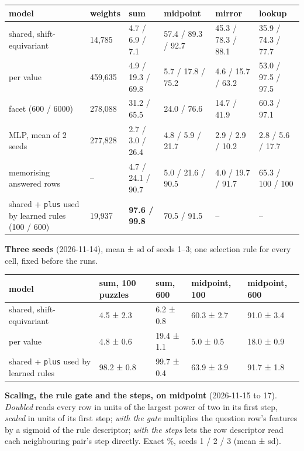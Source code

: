 \begin{center}\small
\begin{tabularx}{\linewidth}{@{}Ylllll@{}}
\toprule
model & weights & sum & midpoint & mirror & lookup \\
\midrule
shared, shift-equivariant & 14,785 & 4.7 / 6.9 / 7.1 & 57.4 / 89.3 / 92.7 & 45.3 / 78.3 / 88.1 & 35.9 / 74.3 / 77.7 \\
per value & 459,635 & 4.9 / 19.3 / 69.8 & 5.7 / 17.8 / 75.2 & 4.6 / 15.7 / 63.2 & 53.0 / 97.5 / 97.5 \\
facet (600 / 6000) & 278,088 & 31.2 / 65.5 & 24.0 / 76.6 & 14.7 / 41.9 & 60.3 / 97.1 \\
MLP, mean of 2 seeds & 277,828 & 2.7 / 3.0 / 26.4 & 4.8 / 5.9 / 21.7 & 2.9 / 2.9 / 10.2 & 2.8 / 5.6 / 17.7 \\
memorising answered rows & – & 4.7 / 24.1 / 90.7 & 5.0 / 21.6 / 90.5 & 4.0 / 19.7 / 91.7 & 65.3 / 100 / 100 \\
shared + \texttt{plus} used by learned rules (100 / 600) & 19,937 & \textbf{97.6 / 99.8} & 70.5 / 91.5 & – & – \\
\bottomrule
\end{tabularx}
\end{center}

\textbf{Three seeds} (2026-11-14), mean ± sd of seeds 1–3; one selection rule for every cell, fixed before the runs.

\begin{center}\small
\begin{tabularx}{\linewidth}{@{}Yllll@{}}
\toprule
model & sum, 100 puzzles & sum, 600 & midpoint, 100 & midpoint, 600 \\
\midrule
shared, shift-equivariant & 4.5 ± 2.3 & 6.2 ± 0.8 & 60.3 ± 2.7 & 91.0 ± 3.4 \\
per value & 4.8 ± 0.6 & 19.4 ± 1.1 & 5.0 ± 0.5 & 18.0 ± 0.9 \\
shared + \texttt{plus} used by learned rules & 98.2 ± 0.8 & 99.7 ± 0.4 & 63.9 ± 3.9 & 91.7 ± 1.8 \\
\bottomrule
\end{tabularx}
\end{center}

\textbf{Scaling, the rule gate and the steps, on midpoint} (2026-11-15 to 17). \emph{Doubled} reads every row in units of the largest power of two in its first step, \emph{scaled} in units of its first step; \emph{with the gate} multiplies the question row's features by a sigmoid of the rule descriptor; \emph{with the steps} lets the row descriptor read each neighbouring pair's step directly. Exact \%, seeds 1 / 2 / 3 (mean ± sd).

